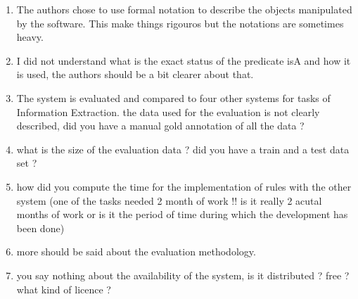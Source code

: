 \begin{enumerate}[leftmargin=0mm,label=\bfseries CommentR1.\arabic*]

  \item \label{Review1.1} 
The authors chose to use formal notation to describe the 
objects manipulated by the software. 
This make things rigouros but the notations are sometimes heavy.


\item \label{Review1.2} 
I did not understand what is the exact status of the predicate 
isA and how it is used, the authors should be a bit 
 clearer about that.


\item \label{Review1.3} 
The system is evaluated and compared to four other systems for 
tasks of Information Extraction.
the data used for the evaluation is not clearly described, 
did you have a manual gold annotation of all the data ?


\item \label{Review1.4} 
what is the size of the evaluation data ? 
did you have a train and a test data set ?

\item \label{Review1.5} 
how did you compute the time for the implementation of rules 
with the other system (one of the tasks needed 2 month of work 
!! is it really 2 acutal months of work or is it the period of 
time during which the development has been done)

\item \label{Review1.5} 
more should be said about the evaluation methodology.

\item \label{Review1.6}
you say nothing about the availability of the system, 
is it distributed ? free ? what kind of licence ?


\end{enumerate}

